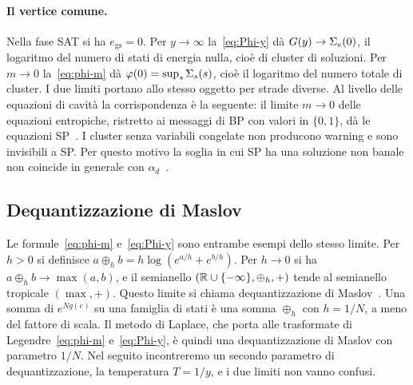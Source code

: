 \paragraph{Il vertice comune.}
Nella fase SAT si ha $e_{\mathrm{gs}}=0$.
Per $y\to\infty$ la~\eqref{eq:Phi-y} dà $G(y)\to\Sigma_e(0)$, il logaritmo del numero di stati di energia nulla, cioè di cluster di soluzioni.
Per $m\to0$ la~\eqref{eq:phi-m} dà $\varphi(0)=\sup_s\Sigma_s(s)$, cioè il logaritmo del numero totale di cluster.
I due limiti portano allo stesso oggetto per strade diverse.
Al livello delle equazioni di cavità la corrispondenza è la seguente: il limite $m\to0$ delle equazioni entropiche, ristretto ai messaggi di BP con valori in $\{0,1\}$, dà le equazioni SP~\citep{krzakala2007clusters,montanari2008clusters,mezard2009information}.
I cluster senza variabili congelate non producono warning e sono invisibili a SP.
Per questo motivo la soglia in cui SP ha una soluzione non banale non coincide in generale con $\alpha_d$~\citep{krzakala2007clusters}.

\subsection{Dequantizzazione di Maslov}

Le formule~\eqref{eq:phi-m} e~\eqref{eq:Phi-y} sono entrambe esempi dello stesso limite.
Per $h>0$ si definisce $a\oplus_h b=h\log(e^{a/h}+e^{b/h})$.
Per $h\to0$ si ha $a\oplus_h b\to\max(a,b)$, e il semianello $(\mathbb{R}\cup\{-\infty\},\oplus_h,+)$ tende al semianello tropicale $(\max,+)$.
Questo limite si chiama dequantizzazione di Maslov~\citep{litvinov2007maslov}.
Una somma di $e^{Ng(e)}$ su una famiglia di stati è una somma $\oplus_h$ con $h=1/N$, a meno del fattore di scala.
Il metodo di Laplace, che porta alle trasformate di Legendre~\eqref{eq:phi-m} e~\eqref{eq:Phi-y}, è quindi una dequantizzazione di Maslov con parametro $1/N$.
Nel seguito incontreremo un secondo parametro di dequantizzazione, la temperatura $T=1/y$, e i due limiti non vanno confusi.
